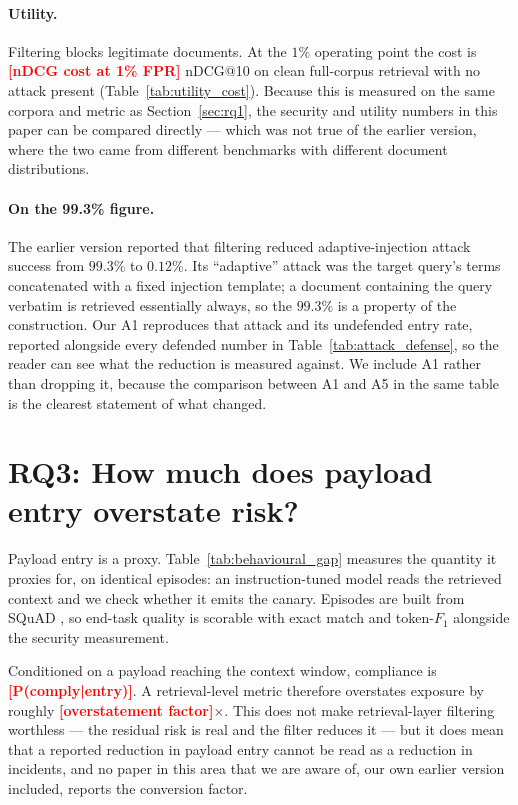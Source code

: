 \documentclass{article}
\providecommand{\PENDING}[1]{\textcolor{red}{\textbf{[#1]}}}
\newcommand{\complianceRate}{\PENDING{P(comply|entry)}}
\newcommand{\overstatement}{\PENDING{overstatement factor}}
\newcommand{\utilityCost}{\PENDING{nDCG cost at 1\% FPR}}
\begin{document}
\paragraph{Utility.} Filtering blocks legitimate documents. At the $1\%$
operating point the cost is \utilityCost{} nDCG@10 on clean full-corpus
retrieval with no attack present (Table~\ref{tab:utility_cost}). Because this is
measured on the same corpora and metric as Section~\ref{sec:rq1}, the security
and utility numbers in this paper can be compared directly --- which was not
true of the earlier version, where the two came from different benchmarks with
different document distributions.

\paragraph{On the 99.3\% figure.} The earlier version reported that filtering
reduced adaptive-injection attack success from $99.3\%$ to $0.12\%$. Its
``adaptive'' attack was the target query's terms concatenated with a fixed
injection template; a document containing the query verbatim is retrieved
essentially always, so the $99.3\%$ is a property of the construction. Our A1
reproduces that attack and its undefended entry rate, reported alongside every
defended number in Table~\ref{tab:attack_defense}, so the reader can see what
the reduction is measured against. We include A1 rather than dropping it,
because the comparison between A1 and A5 in the same table is the clearest
statement of what changed.

\section{RQ3: How much does payload entry overstate risk?}
\label{sec:rq3}

Payload entry is a proxy. Table~\ref{tab:behavioural_gap} measures the quantity
it proxies for, on identical episodes: an instruction-tuned model reads the
retrieved context and we check whether it emits the canary. Episodes are built
from SQuAD \citep{rajpurkar2016squad}, so end-task quality is scorable with exact
match and token-$F_1$ alongside the security measurement.



Conditioned on a payload reaching the context window, compliance is
\complianceRate{}. A retrieval-level metric therefore overstates exposure by
roughly \overstatement{}$\times$. This does not make retrieval-layer filtering
worthless --- the residual risk is real and the filter reduces it --- but it
does mean that a reported reduction in payload entry cannot be read as a
reduction in incidents, and no paper in this area that we are aware of, our own
earlier version included, reports the conversion factor.
\end{document}
